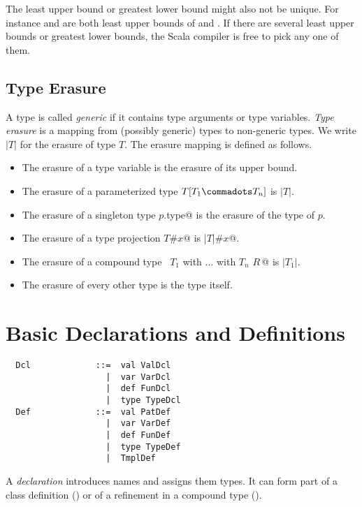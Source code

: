 The least upper bound or greatest lower bound might also not be
unique. For instance  and  are both
least upper bounds of  and . If there are several
least upper bounds or greatest lower bounds, the Scala compiler is
free to pick any one of them.

\section{Type Erasure}
\label{sec:erasure}

A type is called {\em generic} if it contains type arguments or type variables.
{\em Type erasure} is a mapping from (possibly generic) types to
non-generic types. We write $|T|$ for the erasure of type $T$.
The erasure mapping is defined as follows.
\begin{itemize}
\item The erasure of a type variable is the erasure of its upper bound.
\item The erasure of a parameterized type $T[T_1 \commadots T_n]$ is $|T|$.
\item The erasure of a singleton type \lstinline@$p$.type@ is the 
      erasure of the type of $p$.
\item The erasure of a type projection \lstinline@$T$#$x$@ is \lstinline@|$T$|#$x$@.
\item The erasure of a compound type ~\lstinline@$T_1$ with $\ldots$ with $T_n$ {$R\,$}@ 
      is $|T_1|$.
\item The erasure of every other type is the type itself.
\end{itemize}

\chapter{Basic Declarations and Definitions}
\label{sec:defs}

\syntax\begin{lstlisting}
  Dcl             ::=  val ValDcl
                    |  var VarDcl
                    |  def FunDcl
                    |  type TypeDcl
  Def             ::=  val PatDef 
                    |  var VarDef 
                    |  def FunDef 
                    |  type TypeDef 
                    |  TmplDef
\end{lstlisting}

A {\em declaration} introduces names and assigns them types. It can
form part of a class definition () or of a
refinement in a compound type ().

